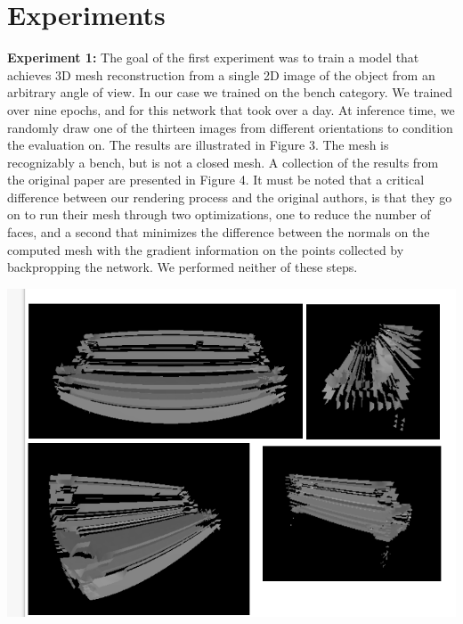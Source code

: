 \documentclass[11pt]{article}
\begin{document}
\section{Experiments}

\textbf{Experiment 1:} The goal of the first experiment was to train a model that achieves 3D mesh reconstruction from a single 2D image of the object from an arbitrary angle of view. In our case we trained on the bench category. We trained over nine epochs, and for this network that took over a day. At inference time, we randomly draw one of the thirteen images from different orientations to condition the evaluation on. The results are illustrated in Figure 3. The mesh is recognizably a bench, but is not a closed mesh. A collection of the results from the original paper are presented in Figure 4. It must be noted that a critical difference between our rendering process and the original authors, is that they go on to run their mesh through two optimizations, one to reduce the number of faces, and a second that minimizes the difference between the normals on the computed mesh with the gradient information on the points collected by backpropping the network. We performed neither of these steps.

\includegraphics[scale=0.6]{resultImages/benches.png}
\\
\end{document}
